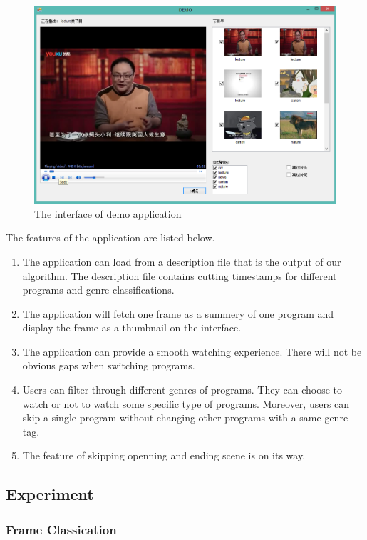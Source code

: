 \documentclass{article}
\begin{document}
  \begin{figure}
    \centering \includegraphics[width=\textwidth]{img/demo.png}
    \caption{The interface of demo application}
  \end{figure}

  The features of the application are listed below.

  \begin{enumerate}
  \item The application can load from a description file that is the output of our algorithm. The description file contains cutting timestamps for different programs and genre classifications.
  \item The application will fetch one frame as a summery of one program and display the frame as a thumbnail on the interface.
  \item The application can provide a smooth watching experience. There will not be obvious gaps when switching programs. 
  \item Users can filter through different genres of programs. They can choose to watch or not to watch some specific type of programs. Moreover, users can skip a single program without changing other programs with a same genre tag.
  \item The feature of skipping openning and ending scene is on its way.
  \end{enumerate}

\subsection{Experiment}

  \subsubsection{Frame Classication}
\end{document}

